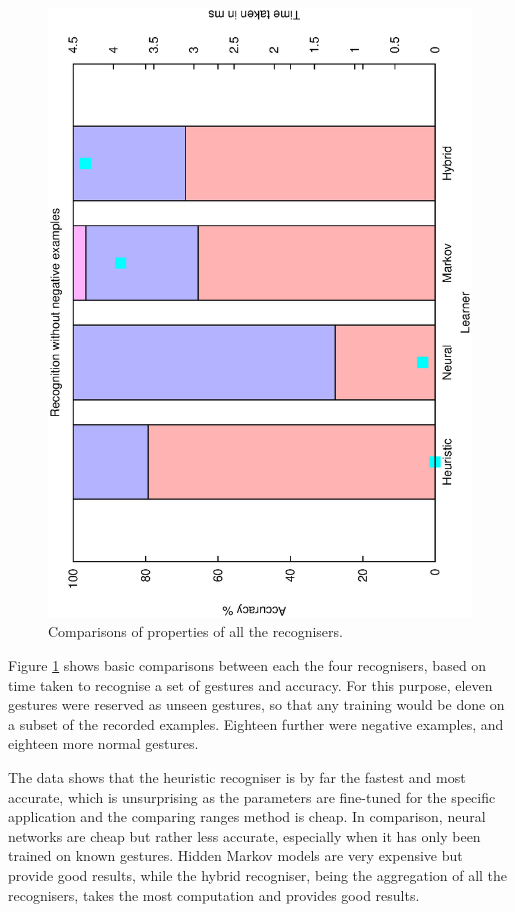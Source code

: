 \documentclass[12pt,a4,notitlepage]{report}
\renewcommand{\_}{\texttt{\symbol{95}}}
\newcommand{\<}{\texttt{\symbol{60}}}
\renewcommand{\>}{\texttt{\symbol{62}}}
\begin{document}
\begin{figure}
\includegraphics[scale=0.3,angle=-90]{results/all/no-neg.ps}
\caption{Comparisons of properties of all the recognisers.}
\label{all_recognisers}
\end{figure}

Figure \ref{all_recognisers} shows basic comparisons between each the four recognisers, based on time taken to recognise a set of gestures and accuracy. For this purpose, eleven gestures were reserved as unseen gestures, so that any training would be done on a subset of the recorded examples. Eighteen further were negative examples, and eighteen more normal gestures.

The data shows that the heuristic recogniser is by far the fastest and most accurate, which is unsurprising as the parameters are fine-tuned for the specific application and the comparing ranges method is cheap. In comparison, neural networks are cheap but rather less accurate, especially when it has only been trained on known gestures. Hidden Markov models are very expensive but provide good results, while the hybrid recogniser, being the aggregation of all the recognisers, takes the most computation and provides good results.
\end{document}
